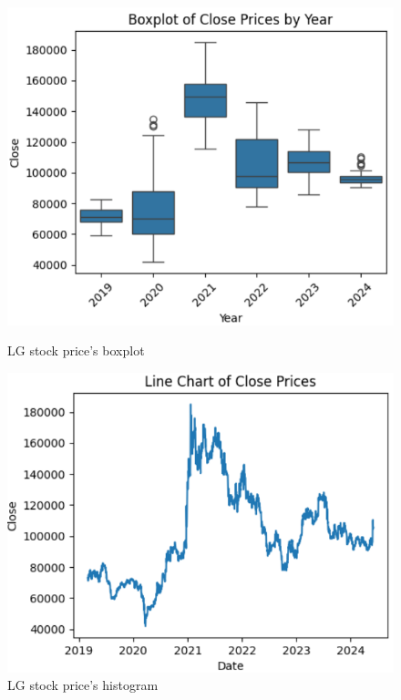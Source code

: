 \documentclass[conference]{IEEEtran}
\begin{document}
\begin{figure}[H]
    \centering
    \begin{minipage}{0.23\textwidth}
    \centering
    \includegraphics[width=1\textwidth]{Image/DatasetImg/LG_Boxplot.png}
    \caption{LG stock price's boxplot}
    \label{fig:1}
    \end{minipage}
    \hfill
    \begin{minipage}{0.23\textwidth}
    \centering
    \includegraphics[width=1\textwidth]{Image/DatasetImg/LG_line_chart.png}
    \caption{LG stock price's histogram}
    \label{fig:2}
    \end{minipage}
\end{figure}
\end{document}
